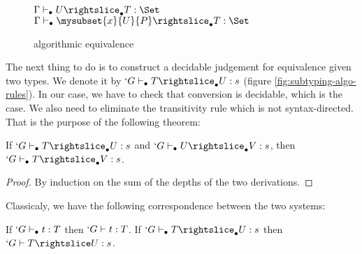 \documentclass{llncs}
\renewcommand{\SubSubAs}[1][\Gamma]{%
\UAX{SubSub}
{$\subalgoimpl{#1}{c}{U}{T}{\Set}$}
{$\subalgoimpl{#1}{c[\eltpit~\ctxdot]}{\mysubset{x}{U}{P}}{T}{\Set}$}
{}
}
\begin{document}
\begin{paragraph}{}

\begin{figure*}
    \def\fCenter{\suba}
    \def\type{\typea}
    \def\sub{\suba}
    \begin{center}
    \SubConvA\DP 

    \vspace{\infvspace}
    \SubHnfA\DP

    \vspace{\infvspace}
    \SubProdA\DP

    \vspace{\infvspace}
    \SubSigmaA\DP

    \vspace{\infvspace}
    \SubProofA\DP

    \vspace{\infvspace}
    \SubSubAs\DP
  \end{center}
  \vspace{-2em}
  \caption{\Russell{} algorithmic equivalence}
  \label{fig:subtyping-algo-rules}
  \vspace{-1em}
\end{figure*}


\end{paragraph}
\begin{paragraph}{}
  The next thing to do is to construct a decidable judgement for
  equivalence given two types. We denote it by $`G \typea T
  \suba U : s$ (figure \vref{fig:subtyping-algo-rules}).
  In our case, we have to check that conversion is decidable, which is the
  case. We also need to eliminate the transitivity rule which is not
  syntax-directed. That is the purpose of the following theorem:
\begin{theorem}
  If $`G \typea T \suba U : s$ and $`G \typea U \suba V : s$, then $`G \typea T
  \suba V : s$.
\end{theorem}
\begin{proof}
  By induction on the sum of the depths of the two derivations.
\end{proof}
\end{paragraph}

Classicaly, we have the following correspondence between the two
systems:
\begin{theorem}[Soundness]
  If $`G \vdash_{\bullet} t : T$ then $`G \vdash t : T$.
  If $`G \typea T \suba{} U : s$ then $`G \typed T \subd U : s$.
\end{theorem}
\end{document}
